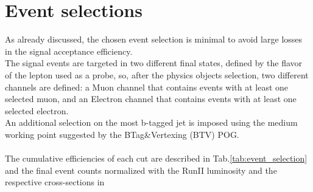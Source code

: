 \newpage
\section{Event selections}
As already discussed, the chosen event selection is minimal to avoid large losses in the signal acceptance efficiency.\\ 
The signal events are targeted in two different final states, defined by the flavor of the lepton used as a probe, so, after the physics objects selection, two different channels are defined: a Muon channel that contains events with at least one selected muon, and an Electron channel that contains events with at least one selected electron.\\
An additional selection on the most b-tagged jet is imposed using the medium working point suggested by the BTag\&Vertexing (BTV) POG.\\
\\
The cumulative efficiencies of each cut are described in Tab.\ref{tab:event_selection} and the final event counts normalized with the RunII luminosity and the respective cross-sections in 
